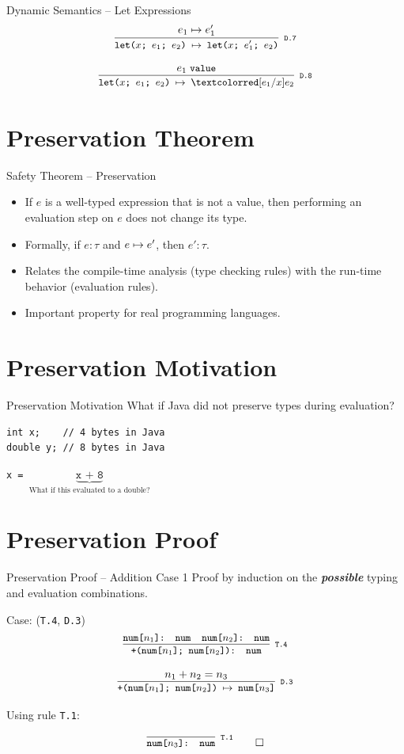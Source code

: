 \documentclass{beamer}
\renewcommand{\emph}[1]{\textbf{\textit{#1}}}
\begin{document}
\begin{frame}{Dynamic Semantics -- Let Expressions}
\[
\cinfer[D.7]{let($x$; $e_1$; $e_2$) $\stepto$ let($x$; $e'_1$; $e_2$)}{e_1 \stepto e'_1}
\]

\[
\cinfer[D.8]{let($x$; $e_1$; $e_2$) $\stepto$ \cemph{$[e_1 / x]e_2$}}{e_1 \; \code{value}}
\]
\end{frame}

\section{Preservation Theorem}

\begin{frame}{Safety Theorem -- Preservation}
\begin{itemize}
\item If $e$ is a well-typed expression that is not a value,
then performing an evaluation step on $e$ does not change
its type.
\item Formally, if $e : \tau$ and $e \mapsto e'$, then $e' : \tau$.

\pause
\item Relates the compile-time analysis (type checking rules)
with the run-time behavior (evaluation rules).
\item Important property for real programming languages.
\end{itemize}
\end{frame}

\section{Preservation Motivation}

\begin{frame}[containsverbatim]{Preservation Motivation}
What if Java did not preserve types during evaluation?
\begin{verbatim}
int x;    // 4 bytes in Java
double y; // 8 bytes in Java
\end{verbatim}
\texttt{x = }$\underbrace{\texttt{x + 8}}_{\text{What if
this evaluated to a double?}}$
\end{frame}

\section{Preservation Proof}

\begin{frame}{Preservation Proof -- Addition Case 1}
Proof by induction on the \emph{possible} typing and
evaluation combinations.

Case: (\texttt{T.4}, \texttt{D.3})
\[
\cinfer[T.4]{+(num[$n_1$]; num[$n_2$]): num}
  {\code{num[$n_1$]: num} & \code{num[$n_2$]: num}}
\]

\[
\cinfer[D.3]{+(num[$n_1$]; num[$n_2$]) $\stepto$ num[$n_3$]}{n_1 + n_2 = n_3}
\]

Using rule \texttt{T.1}:

\[
\cinfer[T.1]{num[$n_3$]: num}{ }
\qed
\]
\end{frame}
\end{document}
